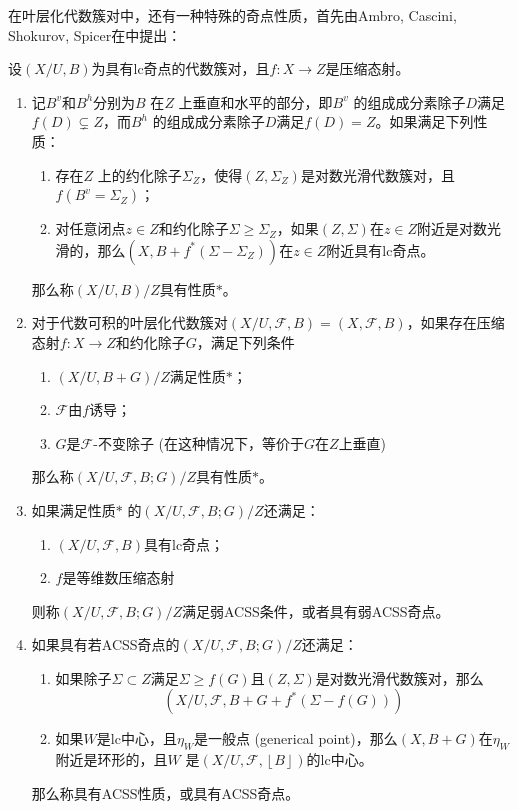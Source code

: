 在叶层化代数簇对中，还有一种特殊的奇点性质，首先由Ambro, Cascini, Shokurov, Spicer在\cite{acss}中提出：
\begin{definition}[ACSS奇点]\cite[Definition 4.1-3]{acc_foliation}
 设$ (X/U,B) $为具有lc奇点的代数簇对，且$f: X\to Z$是压缩态射。
\begin{enumerate}
  \item 记$B^{v}$和$ B^{h}$分别为$B$ 在$Z$ 上垂直和水平的部分，即$B^{v}$ 的组成成分素除子$D$满足$f(D)\subsetneq Z $，而$B^{h}$  的组成成分素除子$D$满足$f(D)= Z$。如果满足下列性质：
        \begin{enumerate}
          \item 存在$Z$ 上的约化除子$\Sigma_{Z}$，使得$(Z,\Sigma_{Z}) $是对数光滑代数簇对，且$f(B^{v}=\Sigma_{Z})$；
          \item 对任意闭点$z \in Z$和约化除子$\Sigma \geqslant \Sigma_{Z}$，如果$(Z,\Sigma)$在$z \in Z$附近是对数光滑的，那么$(X,B+f^{*}(\Sigma-\Sigma_{Z}))$在$z \in Z$附近具有lc奇点。 
        \end{enumerate}
        那么称$(X/U,B)/Z$具有性质$*$。
  \item 对于代数可积的叶层化代数簇对$(X/U,\mathcal{F},B)=(X,\mathcal{F},B)$，如果存在压缩态射$f:X \to Z$和约化除子$G$，满足下列条件
        \begin{enumerate}
          \item $(X/U,B+G)/Z$满足性质$*$；
          \item $\mathcal{F}$由$ f$诱导；
          \item $G$是$\mathcal{F}$-不变除子 (在这种情况下，等价于$G$在$Z$上垂直)
        \end{enumerate}
      那么称$(X/U,\mathcal{F},B;G)/Z$具有性质$*$。
    \item 如果满足性质$*$ 的$(X/U,\mathcal{F},B;G)/Z$还满足：
          \begin{enumerate}
            \item $(X/U,\mathcal{F},B)$具有lc奇点；
            \item $f$是等维数压缩态射
          \end{enumerate}
          则称$(X/U,\mathcal{F},B;G)/Z$满足弱ACSS条件，或者具有弱ACSS奇点。
    \item 如果具有若ACSS奇点的$(X/U,\mathcal{F},B;G)/Z$还满足：
          \begin{enumerate}
            \item 如果除子$\Sigma \subset Z$满足$\Sigma \geqslant f(G)$且$(Z,\Sigma)$是对数光滑代数簇对，那么
              \[ (X/U,\mathcal{F},B+G+f^{*}(\Sigma - f(G ))) \]
            \item 如果$W$是lc中心，且$ \eta_{W}$是一般点 (generical point)，那么$(X,B+G)$在$\eta_{W}$附近是环形的，且$W$ 是$(X/U,\mathcal{F},\left\lfloor B \right\rfloor )$的lc中心。
          \end{enumerate}
          那么称具有ACSS性质，或具有ACSS奇点。
\end{enumerate}
\end{definition}
